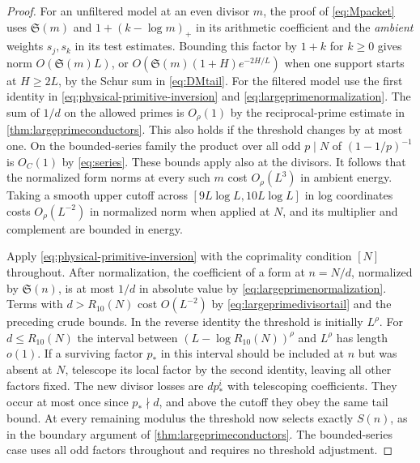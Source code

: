 \documentclass[11pt,a4paper]{article}
\numberwithin{equation}{section}
\newcommand{\SSS}{\mathfrak S}
\begin{document}
\begin{proof}
For an unfiltered model at an even divisor $m$, the proof of
\cref{eq:Mpacket} uses $\SSS(m)$ and $1+(k-\log m)_+$ in its
arithmetic coefficient and the \emph{ambient} weights $s_j,s_k$
in its test estimates. Bounding this factor by $1+k$ for $k\ge0$
gives norm $O(\SSS(m)L)$, or $O(\SSS(m)(1+H)e^{-2H/L})$
when one support starts at $H\ge2L$, by the Schur sum in
\cref{eq:DMtail}. For the filtered model use the first identity
in \eqref{eq:physical-primitive-inversion} and
\cref{eq:largeprimenormalization}. The sum of $1/d$ on the
allowed primes is $O_\rho(1)$ by the reciprocal-prime estimate
in \cref{thm:largeprimeconductors}. This also holds if the
threshold changes by at most one. On the bounded-series family
the product over all odd $p\mid N$ of $(1-1/p)^{-1}$ is $O_C(1)$
by \eqref{eq:series}. These bounds apply also at the divisors.
It follows that the normalized form norms at every such $m$ cost
$O_\rho(L^3)$ in ambient energy. Taking a smooth upper cutoff
across $[9L\log L,10L\log L]$ in log coordinates costs
$O_\rho(L^{-2})$ in normalized norm when applied at $N$, and
its multiplier and complement are bounded in energy.

Apply \eqref{eq:physical-primitive-inversion} with the coprimality
condition $[N]$ throughout. After normalization, the coefficient
of a form at $n=N/d$, normalized by $\SSS(n)$, is at most $1/d$
in absolute value by \cref{eq:largeprimenormalization}.
Terms with $d>R_{10}(N)$ cost $O(L^{-2})$ by
\cref{eq:largeprimedivisortail} and the preceding crude bounds.
In the reverse identity the threshold is initially $L^\rho$.
For $d\le R_{10}(N)$ the interval between
$(L-\log R_{10}(N))^\rho$ and $L^\rho$ has length $o(1)$.
If a surviving factor $p_*$ in this interval should be included
at $n$ but was absent at $N$, telescope its local factor by
the second identity, leaving all other factors fixed. The new
divisor losses are $dp_*^i$ with telescoping coefficients. They
occur at most once since $p_*\nmid d$, and above the cutoff
they obey the same tail bound. At every remaining modulus the
threshold now selects exactly $S(n)$, as in the boundary argument
of \cref{thm:largeprimeconductors}. The bounded-series case uses
all odd factors throughout and requires no threshold adjustment.


\end{proof}
\end{document}

